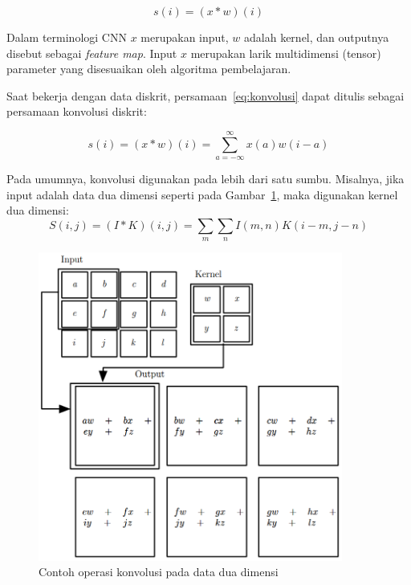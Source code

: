 \begin{equation}
    \label{eq:konvolusi}
    s(i) = (x * w)(i)
\end{equation}

Dalam terminologi CNN $x$ merupakan input, $w$ adalah kernel, dan outputnya disebut sebagai \textit{feature map}. Input $x$ merupakan larik multidimensi (tensor) parameter yang disesuaikan oleh algoritma pembelajaran.

Saat bekerja dengan data diskrit, persamaan~\ref{eq:konvolusi} dapat ditulis sebagai persamaan konvolusi diskrit:

\begin{equation}
    \label{eq:konvolusi-diskrit}
    s(i) = (x * w)(i) = \sum_{a=-\infty}^{\infty} x(a) w(i - a)
\end{equation}

Pada umumnya, konvolusi digunakan pada lebih dari satu sumbu. Misalnya, jika input adalah data dua dimensi seperti pada Gambar~\ref{gambar:konvolusi-2d}, maka digunakan kernel dua dimensi:
\begin{equation}
    \label{eq:konvolusi-2d}
    S(i,j) = (I * K)(i,j) = \sum_{m}\sum_{n}I(m,n)K(i-m, j-n)
\end{equation}

\begin{figure}[t!]
    \centering
    \includegraphics[width=10cm]{gambar/landasan-teori/konvolusi-2d.png}
    \caption{Contoh operasi konvolusi pada data dua dimensi \citep{goodfellow-2016}}
    \label{gambar:konvolusi-2d}
\end{figure}


%
